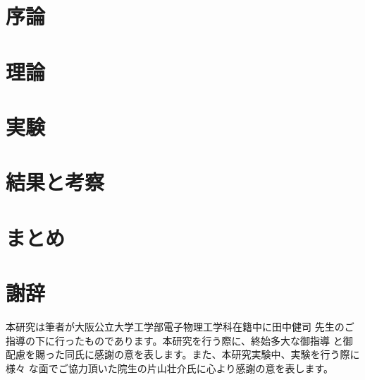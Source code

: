 \documentclass[report,a4paper,11pt]{jlreq}
\begin{document}
  
\pagestyle{plain}         %

\tableofcontents
\clearpage                %

\pagestyle{fancy}
\lhead{\rightmark}
\renewcommand{\chaptermark}[1]{\markboth{第\ \normalfont\thechapter\ 章~~#1}{}}


\chapter{序論}
    

%
\chapter{理論}
	

\chapter{実験}
	
	
	
\chapter{結果と考察}
	

\chapter{まとめ}
	

\chapter*{謝辞}
\pagestyle{plain}
{}
本研究は筆者が大阪公立大学工学部電子物理工学科在籍中に田中健司
先生のご指導の下に行ったものであります。本研究を行う際に、終始多大な御指導
と御配慮を賜った同氏に感謝の意を表します。また、本研究実験中、実験を行う際に様々
な面でご協力頂いた院生の片山壮介氏に心より感謝の意を表します。
\cleardoublepage
{} 
{}
\printbibliography[title=参考文献]

 
 
\end{document}
